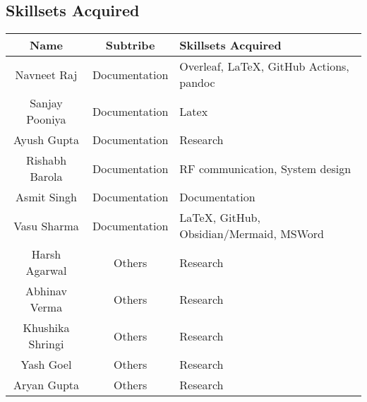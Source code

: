 \subsection{Skillsets Acquired}
\begin{center}
    \label{table:skillsets}
    \begin{longtable}{ | c | c | m{6cm} | }
        \hline
        \textbf{Name}              & \textbf{Subtribe} & \textbf{Skillsets Acquired}                                             \\
        \hline \hline
        Navneet Raj                & Documentation     & Overleaf, LaTeX, GitHub Actions, pandoc                                 \\
        \hline
        Sanjay Pooniya             & Documentation     & Latex                                                                   \\
        \hline
        Ayush Gupta                & Documentation     & Research                                                                \\
        \hline
        Rishabh Barola             & Documentation     & RF communication, System design                                         \\
        \hline
        Asmit Singh                & Documentation     & Documentation                                                           \\
        \hline
        Vasu Sharma                & Documentation     & LaTeX, GitHub, Obsidian/Mermaid, MSWord                                 \\
        \hline
        Harsh Agarwal              & Others            & Research                                                                \\
        \hline
        Abhinav Verma              & Others            & Research                                                                \\
        \hline
        Khushika Shringi           & Others            & Research                                                                \\
        \hline
        Yash Goel                  & Others            & Research                                                                \\
        \hline
        Aryan Gupta                & Others            & Research                                                                \\

\end{longtable}
\end{center}
